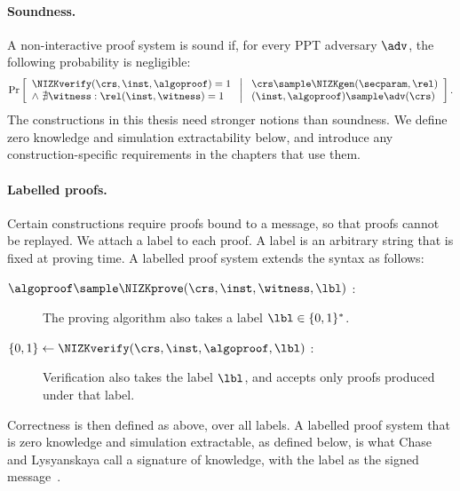 \paragraph{Soundness.} A non-interactive proof system is sound if, for every
PPT adversary $\adv$, the following probability is negligible:
%
\begin{equation*}
%
  \Pr\left[ \begin{array}{l} \NIZKverify(\crs, \inst, \algoproof) = 1 \\
\wedge\ \nexists \witness : \rel(\inst, \witness) = 1 \end{array} \
\middle| \ \begin{array}{l} \crs \sample \NIZKgen(\secparam, \rel) \\
(\inst, \algoproof) \sample \adv(\crs) \end{array} \right].
%
\end{equation*}
%
The constructions in this thesis need stronger notions than soundness. We define
zero knowledge and simulation extractability below, and introduce any
construction-specific requirements in the chapters that use them.

\paragraph{Labelled proofs.} Certain constructions require proofs bound to a
message, so that proofs cannot be replayed. We attach a label to each proof. A
label is an arbitrary string that is fixed at proving time.  A
labelled proof system extends the syntax as follows:

\begin{description}

  \item[$\algoproof \sample \NIZKprove(\crs, \inst, \witness, \lbl)$ :] The
proving algorithm also takes a label $\lbl \in \{0,1\}^*$.

  \item[$\{0, 1\} \leftarrow \NIZKverify(\crs, \inst, \algoproof, \lbl)$ :]
Verification also takes the label $\lbl$, and accepts only proofs produced
under that label.

\end{description}

Correctness is then defined as above, over all labels. A labelled proof system that is
zero knowledge and simulation extractable, as defined below, is what Chase and
Lysyanskaya call a signature of knowledge, with the label as the signed
message~\cite{C:ChaLys06}.

